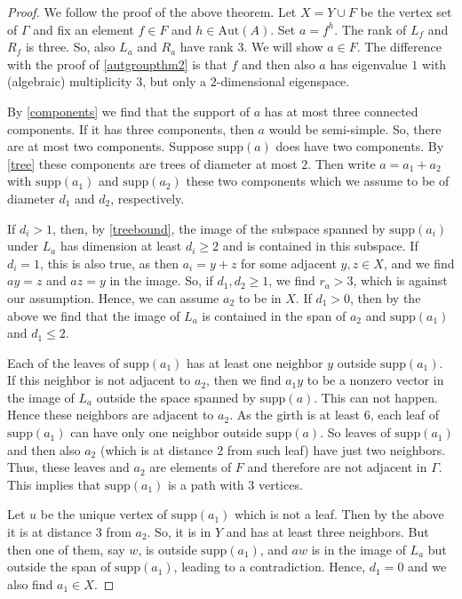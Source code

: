 \documentclass[oneside,a4paper]{amsart} %
\theoremstyle{definition}
\begin{document}
\begin{proof}
We follow the proof of the above theorem.
Let $X=Y\cup F$ be the vertex set of $\Gamma$ and fix an element $f\in F$ and $h\in \mathrm{Aut}(A)$.
Set $a=f^h$.
The rank of  $L_f$ and $R_f$ is three. So, also $L_a$ and $R_a$ have rank $3$.
We will show $a\in F$.
The difference with the proof of \cref{autgroupthm2} is that $f$ and then also $a$ has eigenvalue $1$ with (algebraic) multiplicity $3$, but only a $2$-dimensional eigenspace. 

By \cref{components} we find that the support of $a$ has at most three connected components.
If it has three components, then $a$ would be semi-simple. So, there are at most two components.
Suppose $\mathrm{supp}(a)$ does have two components. By \cref{tree} these components  are trees  of diameter at most $2$.
Then write $a=a_1+a_2$ with $\mathrm{supp}(a_1)$ and $\mathrm{supp}(a_2)$ these two components which we assume
to be of diameter $d_1$ and $d_2$, respectively.

If $d_i>1$, then, by \cref{treebound}, the image of the subspace spanned by $\mathrm{supp}(a_i)$ under $L_a$ has dimension at least $d_i\geq 2$
and is contained in this subspace.
If $d_i=1$, this is also true, as then $a_i=y+z$ for some adjacent $y,z\in X$, and we find  $ay=z$ and  $az=y$ in the image.
So, if  $d_1,d_2\geq 1$, we find $r_a>3$, which is against our assumption.
Hence, we can assume $a_2$ to be in $X$.
If $d_1>0$,  then by the above we find that the  image of $L_a$ is contained in the span of $a_2$ and $\mathrm{supp}(a_1)$ and $d_1\leq 2$.

Each of the leaves of $\mathrm{supp}(a_1)$ has at least one neighbor $y$ outside $\mathrm{supp}(a_1)$.
If this neighbor is not adjacent to $a_2$, then we find $a_1y$ to be a nonzero vector in the image of $L_a$ outside 
the space spanned by $\mathrm{supp}(a)$.
This can not happen. Hence these neighbors are adjacent to $a_2$. As the girth is at least $6$, each leaf of  $\mathrm{supp}(a_1)$ can have only one neighbor outside
$\mathrm{supp}(a)$.
So leaves of $\mathrm{supp}(a_1)$ and then also $a_2$ (which is at distance $2$ from such leaf) have just two neighbors.
Thus, these leaves and $a_2$ are elements of $F$ and therefore  are not adjacent in $\Gamma$.
This implies that  $\mathrm{supp}(a_1)$ is a path with $3$ vertices.

Let $u$ be the unique vertex of $\mathrm{supp}(a_1)$ which is not a leaf.
Then by the above it is at distance $3$ from $a_2$. So, it is in $Y$ and  has at least three neighbors.
But then  one of them, say $w$, is outside $\mathrm{supp}(a_1)$, and $aw$ is in the image of $L_a$ but outside the span of $\mathrm{supp}(a_1)$, leading to a contradiction. 
Hence, $d_1=0$ and we also find $a_1\in X$.


\end{proof}
\end{document}
